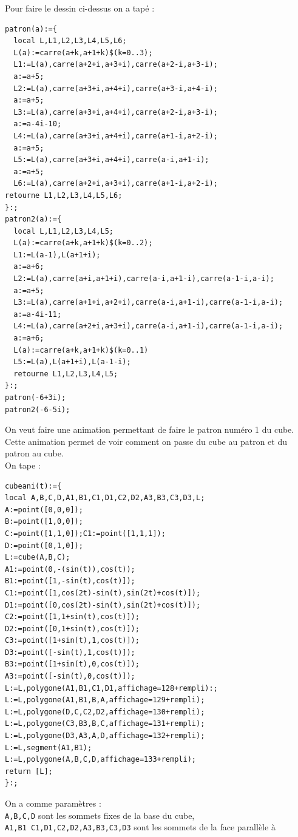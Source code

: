 \documentclass[a4paper,11pt]{book}
\begin{document}
Pour faire le dessin ci-dessus on a tap\'e :\\
\begin{verbatim}
patron(a):={
  local L,L1,L2,L3,L4,L5,L6;
  L(a):=carre(a+k,a+1+k)$(k=0..3);
  L1:=L(a),carre(a+2+i,a+3+i),carre(a+2-i,a+3-i);
  a:=a+5;
  L2:=L(a),carre(a+3+i,a+4+i),carre(a+3-i,a+4-i);
  a:=a+5;
  L3:=L(a),carre(a+3+i,a+4+i),carre(a+2-i,a+3-i);
  a:=a-4i-10;
  L4:=L(a),carre(a+3+i,a+4+i),carre(a+1-i,a+2-i);
  a:=a+5;
  L5:=L(a),carre(a+3+i,a+4+i),carre(a-i,a+1-i);
  a:=a+5;
  L6:=L(a),carre(a+2+i,a+3+i),carre(a+1-i,a+2-i);
retourne L1,L2,L3,L4,L5,L6;
}:;
patron2(a):={
  local L,L1,L2,L3,L4,L5;
  L(a):=carre(a+k,a+1+k)$(k=0..2);
  L1:=L(a-1),L(a+1+i);
  a:=a+6;
  L2:=L(a),carre(a+i,a+1+i),carre(a-i,a+1-i),carre(a-1-i,a-i);
  a:=a+5;
  L3:=L(a),carre(a+1+i,a+2+i),carre(a-i,a+1-i),carre(a-1-i,a-i);
  a:=a-4i-11;
  L4:=L(a),carre(a+2+i,a+3+i),carre(a-i,a+1-i),carre(a-1-i,a-i);
  a:=a+6;
  L(a):=carre(a+k,a+1+k)$(k=0..1)
  L5:=L(a),L(a+1+i),L(a-1-i);
  retourne L1,L2,L3,L4,L5;
}:;
patron(-6+3i);
patron2(-6-5i);
\end{verbatim}
On veut faire une animation permettant de faire le patron num\'ero 1 du cube.\\ 
Cette animation permet de voir comment on passe du cube au patron et du patron 
au cube.\\
On tape :\\
\begin{verbatim}
cubeani(t):={
local A,B,C,D,A1,B1,C1,D1,C2,D2,A3,B3,C3,D3,L;
A:=point([0,0,0]);
B:=point([1,0,0]);
C:=point([1,1,0]);C1:=point([1,1,1]);
D:=point([0,1,0]);
L:=cube(A,B,C);
A1:=point(0,-(sin(t)),cos(t));
B1:=point([1,-sin(t),cos(t)]);
C1:=point([1,cos(2t)-sin(t),sin(2t)+cos(t)]);
D1:=point([0,cos(2t)-sin(t),sin(2t)+cos(t)]);
C2:=point([1,1+sin(t),cos(t)]);
D2:=point([0,1+sin(t),cos(t)]);
C3:=point([1+sin(t),1,cos(t)]);
D3:=point([-sin(t),1,cos(t)]);
B3:=point([1+sin(t),0,cos(t)]);
A3:=point([-sin(t),0,cos(t)]);
L:=L,polygone(A1,B1,C1,D1,affichage=128+rempli):;
L:=L,polygone(A1,B1,B,A,affichage=129+rempli);
L:=L,polygone(D,C,C2,D2,affichage=130+rempli);
L:=L,polygone(C3,B3,B,C,affichage=131+rempli);
L:=L,polygone(D3,A3,A,D,affichage=132+rempli);
L:=L,segment(A1,B1);
L:=L,polygone(A,B,C,D,affichage=133+rempli);
return [L];
}:;
\end{verbatim}
On a comme param\`etres :\\
{\tt A,B,C,D} sont les sommets fixes de la base du cube,\\
{\tt A1,B1 C1,D1,C2,D2,A3,B3,C3,D3} sont les sommets de la face parall\`ele \`a 
\end{document}

